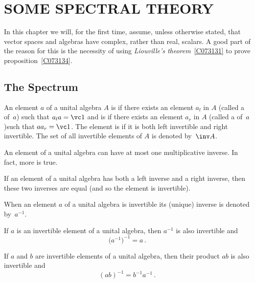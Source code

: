 \chapter{SOME SPECTRAL THEORY}\label{spectrum}

In this chapter we will, for the first time, assume, unless otherwise stated, that vector
spaces and algebras have complex, rather than real, scalars. A good part of the reason
for this is the necessity of using \emph{Liouville's theorem}~\ref{C073131} to prove
proposition~\ref{C073134}.

\section{The Spectrum}

\begin{defn} An element $a$ of a unital algebra $A$ is
 if there exists an element $a_l$ in $A$ (called a 
of~$a$) such that $a_l a = \vc 1$ and is
 if there exists an element $a_r$ in $A$ (called a  of~$a$)such that $aa_r = \vc 1$. The element is
 if it is both left invertible and right invertible. The set of all
invertible elements of $A$ is denoted
by~$\inv A$.
\end{defn}

An element of a unital algebra can have at most one multiplicative inverse.  In fact,
more is true.

\begin{prop}\label{000521} If an element of a unital algebra has both a left inverse and a
right inverse, then these two inverses are equal (and so the element is invertible).
\end{prop}

When an element $a$ of a unital algebra is invertible its (unique) inverse is denoted
by~$a^{-1}$.

\begin{prop} If $a$ is an invertible element of a unital algebra, then $a^{-1}$ is also
invertible and
   \[ \bigl(a^{-1}\bigr)^{-1} = a\,. \]
\end{prop}

\begin{prop} If $a$ and $b$ are invertible elements of a unital algebra, then their product
$ab$ is also invertible and
  \[ (ab)^{-1} = b^{-1}a^{-1}\,. \]
\end{prop}

